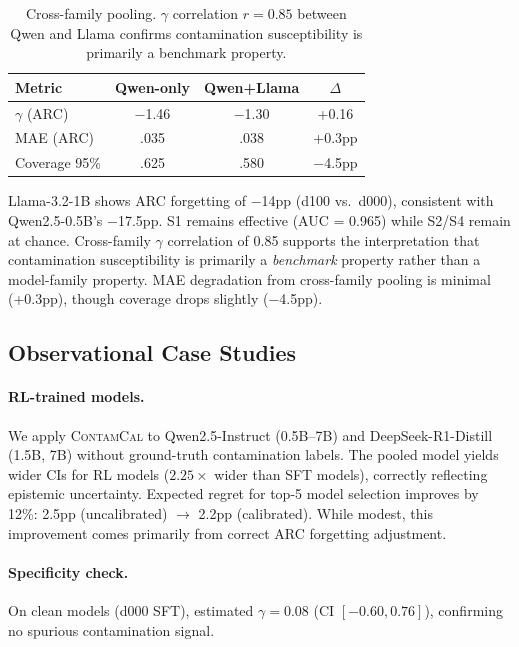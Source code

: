 \documentclass[11pt,a4paper]{article}
\newcommand{\contamcal}{\textsc{ContamCal}}
\begin{document}
\begin{table}[t]
\centering
\small
\caption{Cross-family pooling. $\gamma$ correlation $r=0.85$ between Qwen and Llama confirms contamination susceptibility is primarily a benchmark property.}
\label{tab:cross_family}
\begin{tabular}{lccc}
\toprule
Metric & Qwen-only & Qwen+Llama & $\Delta$ \\
\midrule
$\gamma$ (ARC) & $-$1.46 & $-$1.30 & +0.16 \\
MAE (ARC) & .035 & .038 & +0.3pp \\
Coverage 95\% & .625 & .580 & $-$4.5pp \\
\bottomrule
\end{tabular}
\end{table}

Llama-3.2-1B shows ARC forgetting of $-$14pp (d100 vs.\ d000), consistent with Qwen2.5-0.5B's $-$17.5pp. S1 remains effective (AUC = 0.965) while S2/S4 remain at chance. Cross-family $\gamma$ correlation of 0.85 supports the interpretation that contamination susceptibility is primarily a \emph{benchmark} property rather than a model-family property. MAE degradation from cross-family pooling is minimal (+0.3pp), though coverage drops slightly ($-$4.5pp).

\subsection{Observational Case Studies}
\label{sec:observational}

\paragraph{RL-trained models.} We apply \contamcal{} to Qwen2.5-Instruct (0.5B--7B) and DeepSeek-R1-Distill (1.5B, 7B) without ground-truth contamination labels. The pooled model yields wider CIs for RL models ($2.25\times$ wider than SFT models), correctly reflecting epistemic uncertainty. Expected regret for top-5 model selection improves by 12\%: 2.5pp (uncalibrated) $\to$ 2.2pp (calibrated). While modest, this improvement comes primarily from correct ARC forgetting adjustment.

\paragraph{Specificity check.} On clean models (d000 SFT), estimated $\gamma = 0.08$ (CI $[-0.60, 0.76]$), confirming no spurious contamination signal.
\end{document}
